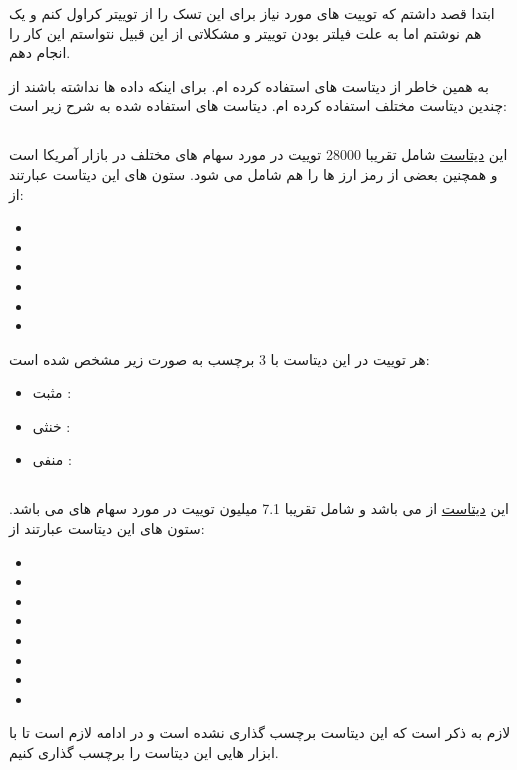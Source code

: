 {
	ابتدا قصد داشتم که توییت های مورد نیاز برای این تسک را از توییتر کراول کنم و یک  هم نوشتم اما به علت فیلتر بودن توییتر و مشکلاتی از این قبیل نتواستم این کار را انجام دهم.
	
	به همین خاطر از دیتاست های  استفاده کرده ام. برای اینکه داده ها  نداشته باشند از چندین دیتاست مختلف استفاده کرده ام. دیتاست های استفاده شده به شرح زیر است:
	
	\subsection{}
	{
		
		این \href{https://www.kaggle.com/datasets/chenxidong/stock-tweet-sentiment-dataset}{دیتاست} 
		شامل تقریبا 28000 توییت در مورد سهام های مختلف در بازار 
		آمریکا است و همچنین بعضی از رمز ارز ها را هم شامل می شود. 
		\newline ستون های این دیتاست عبارتند از: 
		\begin{itemize}
			\item {}
			\item {}
			\item {}
			\item {}
			\item {}
			\item {}
		\end{itemize}
		 هر توییت در این دیتاست با 3 برچسب به صورت زیر مشخص شده است:
		\begin{itemize}
			\item مثبت  : 
			\item خنثی  : 
			\item منفی  : 
		\end{itemize}
		
	}
	\subsection{}
	{
		این \href{https://huggingface.co/datasets/mjw/stock_market_tweets}{دیتاست}
		از 
		می باشد و شامل تقریبا 7.1 میلیون توییت در مورد سهام های 
		می باشد.
		\newline ستون های این دیتاست عبارتند از:
		\begin{itemize}
			\item {}
			\item {}
			\item {}
			\item {}
			\item {}
			\item {}
			\item {}
			\item {}
		\end{itemize}
		لازم به ذکر است که 
		این دیتاست برچسب گذاری نشده است و در ادامه لازم است تا با ابزار هایی این دیتاست را برچسب گذاری کنیم.
	}
}
